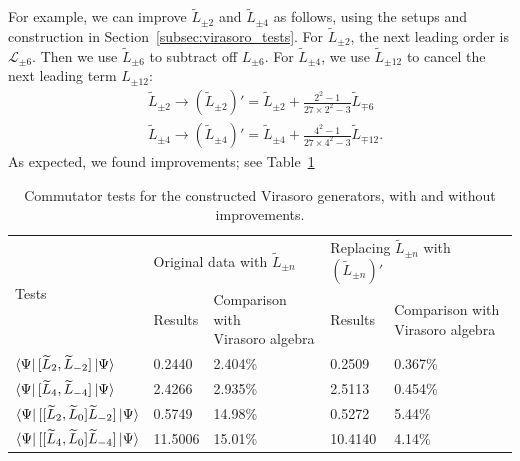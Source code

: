 \documentclass[12pt, nofootinbib]{article}
\theoremstyle{plain}
\theoremstyle{assumption}
\theoremstyle{definition}
\theoremstyle{plain}
\theoremstyle{plain}
\theoremstyle{plain}
\theoremstyle{plain}
\theoremstyle{plain}
\def\Leff{\widetilde{L}}
\def\Lcft{\mathscr{L}}
\begin{document}
For example, we can improve $\Leff_{\pm 2}$ and $\Leff_{\pm 4}$ as follows, using the setups and construction in Section~\ref{subsec:virasoro_tests}. For $\Leff_{\pm 2}$, the next leading order is $\Lcft_{\pm 6}$. Then we use $\Leff_{\pm 6}$ to subtract off $L_{\pm 6}$. For $\Leff_{\pm 4}$, we use $\Leff_{\pm 12}$ to cancel the next leading term $L_{\pm 12}$: 
\begin{equation}\begin{split}
    &\Leff_{\pm 2} \to (\Leff_{\pm 2})' = \Leff_{\pm 2} + \frac{2^2-1}{27\times 2^2-3}\Leff_{\mp 6} \\ 
    &\Leff_{\pm 4} \to (\Leff_{\pm 4})' = \Leff_{\pm 4} + \frac{4^2-1}{27\times 4^2-3}\Leff_{\mp 12}. 
\end{split}
\end{equation}
As expected, we found improvements; see Table~\ref{table:vir-improvement}

\begin{table}[!h]
\setlength\extrarowheight{3pt}
\begin{tabular}{|l|ll|ll|}
\hline
\multirow{2}{*}{Tests}                                & \multicolumn{2}{l|}{Original data with $\Leff_{\pm n}$}                            & \multicolumn{2}{l|}{Replacing $\Leff_{\pm n}$ with $(\Leff_{\pm n})'$}                         \\ \cline{2-5} 
                                                      & \multicolumn{1}{l|}{Results} & \makecell{Comparison with \\ Virasoro algebra} & \multicolumn{1}{l|}{Results} & \makecell{Comparison with \\ Virasoro algebra} \\ \hline
$\bra{\Psi} [\Leff_2, \Leff_{-2}]\ket{\Psi}$          & \multicolumn{1}{l|}{0.2440}  & 2.404\%                          & \multicolumn{1}{l|}{0.2509}  & 0.367\%                          \\ \hline
$\bra{\Psi} [\Leff_4, \Leff_{-4}]\ket{\Psi}$          & \multicolumn{1}{l|}{2.4266}  & 2.935\%                          & \multicolumn{1}{l|}{2.5113}  & 0.454\%                          \\ \hline
$\bra{\Psi} [[\Leff_2,\Leff_0] \Leff_{-2}]\ket{\Psi}$ & \multicolumn{1}{l|}{0.5749}  & 14.98\%                          & \multicolumn{1}{l|}{0.5272}  & 5.44\%                           \\ \hline
$\bra{\Psi} [[\Leff_4,\Leff_0] \Leff_{-4}]\ket{\Psi}$ & \multicolumn{1}{l|}{11.5006} & 15.01\%                          & \multicolumn{1}{l|}{10.4140} & 4.14\%                           \\ \hline
\end{tabular}
\caption{Commutator tests for the constructed Virasoro generators, with and without improvements. }
\label{table:vir-improvement}
\end{table}
\end{document}
